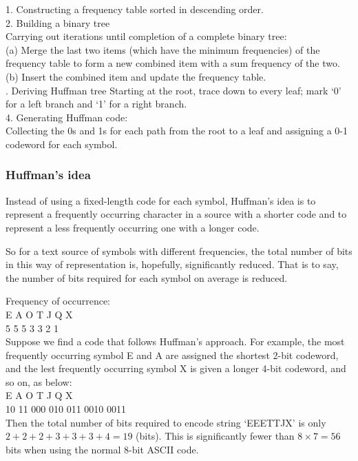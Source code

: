 \begin{frame}
\large
1. Constructing a frequency table sorted in descending order.\\
2. Building a binary tree\\
Carrying out iterations until completion of a complete binary tree:\\
(a) Merge the last two items (which have the minimum frequencies) of
the frequency table to form a new combined item with a sum
frequency of the two.\\
(b) Insert the combined item and update the frequency table.\\ . Deriving Huffman tree
Starting at the root, trace down to every leaf; mark ‘0’ for a left branch
and ‘1’ for a right branch.\\
4. Generating Huffman code:\\
Collecting the 0s and 1s for each path from the root to a leaf and
assigning a 0-1 codeword for each symbol.
\end{frame}
\begin{frame}
\frametitle{Huffman’s idea}
Instead of using a fixed-length code for each symbol, Huffman’s idea is to
represent a frequently occurring character in a source with a shorter code and
to represent a less frequently occurring one with a longer code. 

So for a text
source of symbols with different frequencies, the total number of bits in this
way of representation is, hopefully, significantly reduced. That is to say, the
number of bits required for each symbol on average is reduced.
\end{frame}
\begin{frame}
Frequency of occurrence:\\
E A O T J Q X\\
5 5 5 3 3 2 1\\
Suppose we find a code that follows Huffman’s approach. For example, the
most frequently occurring symbol E and A are assigned the shortest 2-bit
codeword, and the lest frequently occurring symbol X is given a longer 4-bit
codeword, and so on, as below:\\
E A O T J Q X\\
10 11 000 010 011 0010 0011\\
Then the total number of bits required to encode string `EEETTJX’ is only
$2 + 2 + 2 + 3 + 3 + 3 + 4 = 19$ (bits). This is significantly fewer than
$8 \times 7 = 56$ bits when using the normal 8-bit ASCII code.
\end{frame}

